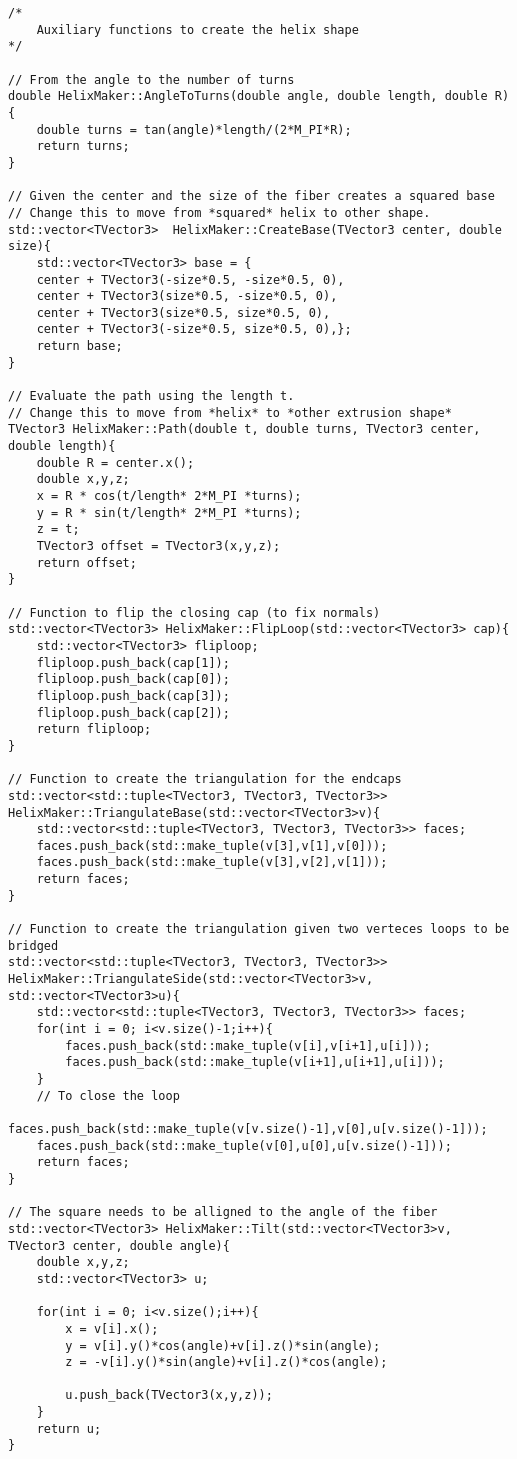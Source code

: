 \begin{lstlisting}
/*
    Auxiliary functions to create the helix shape
*/

// From the angle to the number of turns
double HelixMaker::AngleToTurns(double angle, double length, double R){
    double turns = tan(angle)*length/(2*M_PI*R);
    return turns;
}

// Given the center and the size of the fiber creates a squared base
// Change this to move from *squared* helix to other shape.
std::vector<TVector3>  HelixMaker::CreateBase(TVector3 center, double size){
    std::vector<TVector3> base = {
    center + TVector3(-size*0.5, -size*0.5, 0),
    center + TVector3(size*0.5, -size*0.5, 0),
    center + TVector3(size*0.5, size*0.5, 0),
    center + TVector3(-size*0.5, size*0.5, 0),};
    return base;
}

// Evaluate the path using the length t. 
// Change this to move from *helix* to *other extrusion shape*
TVector3 HelixMaker::Path(double t, double turns, TVector3 center, double length){
    double R = center.x();
    double x,y,z;
    x = R * cos(t/length* 2*M_PI *turns);
    y = R * sin(t/length* 2*M_PI *turns);
    z = t;
    TVector3 offset = TVector3(x,y,z);
    return offset;
}

// Function to flip the closing cap (to fix normals)
std::vector<TVector3> HelixMaker::FlipLoop(std::vector<TVector3> cap){
    std::vector<TVector3> fliploop;
    fliploop.push_back(cap[1]);
    fliploop.push_back(cap[0]);
    fliploop.push_back(cap[3]);
    fliploop.push_back(cap[2]);
    return fliploop;
}

// Function to create the triangulation for the endcaps
std::vector<std::tuple<TVector3, TVector3, TVector3>> HelixMaker::TriangulateBase(std::vector<TVector3>v){
    std::vector<std::tuple<TVector3, TVector3, TVector3>> faces;
    faces.push_back(std::make_tuple(v[3],v[1],v[0]));
    faces.push_back(std::make_tuple(v[3],v[2],v[1]));
    return faces;
}

// Function to create the triangulation given two verteces loops to be bridged
std::vector<std::tuple<TVector3, TVector3, TVector3>> HelixMaker::TriangulateSide(std::vector<TVector3>v, std::vector<TVector3>u){
    std::vector<std::tuple<TVector3, TVector3, TVector3>> faces;
    for(int i = 0; i<v.size()-1;i++){
        faces.push_back(std::make_tuple(v[i],v[i+1],u[i]));
        faces.push_back(std::make_tuple(v[i+1],u[i+1],u[i]));
    }
    // To close the loop
    faces.push_back(std::make_tuple(v[v.size()-1],v[0],u[v.size()-1]));
    faces.push_back(std::make_tuple(v[0],u[0],u[v.size()-1]));
    return faces;
}

// The square needs to be alligned to the angle of the fiber
std::vector<TVector3> HelixMaker::Tilt(std::vector<TVector3>v,  TVector3 center, double angle){
    double x,y,z;
    std::vector<TVector3> u;

    for(int i = 0; i<v.size();i++){
        x = v[i].x();
        y = v[i].y()*cos(angle)+v[i].z()*sin(angle);
        z = -v[i].y()*sin(angle)+v[i].z()*cos(angle);
             
        u.push_back(TVector3(x,y,z));
    }
    return u;
}
\end{lstlisting}
